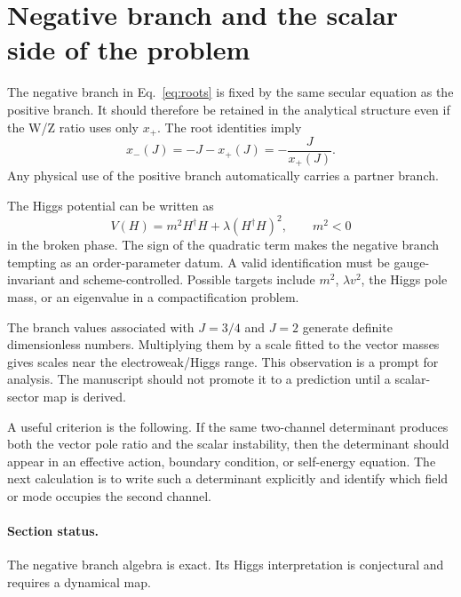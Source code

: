 \section{Negative branch and the scalar side of the problem}
\label{sec:negative}

The negative branch in Eq.~\eqref{eq:roots} is fixed by the same secular equation as the positive branch.  It should therefore be retained in the analytical structure even if the W/Z ratio uses only \(x_+\).  The root identities imply
\begin{equation}
  x_-(J)=-J-x_+(J)=-\frac{J}{x_+(J)}.
  \label{eq:negative-from-positive}
\end{equation}
Any physical use of the positive branch automatically carries a partner branch.

The Higgs potential can be written as
\begin{equation}
  V(H)=m^2 H^\dagger H+\lambda (H^\dagger H)^2,
  \qquad m^2<0
  \label{eq:higgs-potential}
\end{equation}
in the broken phase.  The sign of the quadratic term makes the negative branch tempting as an order-parameter datum.  A valid identification must be gauge-invariant and scheme-controlled.  Possible targets include \(m^2\), \(\lambda v^2\), the Higgs pole mass, or an eigenvalue in a compactification problem.

The branch values associated with \(J=3/4\) and \(J=2\) generate definite dimensionless numbers.  Multiplying them by a scale fitted to the vector masses gives scales near the electroweak/Higgs range.  This observation is a prompt for analysis.  The manuscript should not promote it to a prediction until a scalar-sector map is derived.

A useful criterion is the following.  If the same two-channel determinant produces both the vector pole ratio and the scalar instability, then the determinant should appear in an effective action, boundary condition, or self-energy equation.  The next calculation is to write such a determinant explicitly and identify which field or mode occupies the second channel.

\paragraph*{Section status.}  The negative branch algebra is exact.  Its Higgs interpretation is conjectural and requires a dynamical map.
